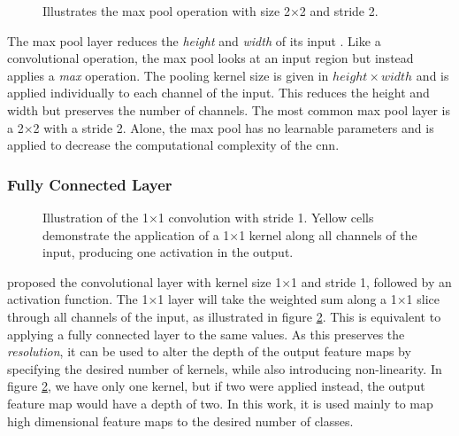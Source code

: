     \begin{figure}[H]
        \centering
                
        \caption[The max pool operation]{Illustrates the max pool operation with size 2×2 and stride 2.}
      	\medskip 
        \label{maxpool_fig}
    \end{figure}
    The max pool layer reduces the \textit{height} and \textit{width} of its input \cite{o2015introduction_convolutions}. Like a convolutional operation, the max pool looks at an input region but instead applies a \textit{max} operation. The pooling kernel size is given in $height \times width$ and is applied individually to each channel of the input. This reduces the height and width but preserves the number of channels. The most common max pool layer is a 2×2 with a stride 2. Alone, the max pool has no learnable parameters and is applied to decrease the computational complexity of the \gls{cnn}.


\subsubsection{Fully Connected Layer}
    \begin{figure}[H]
        \centering
        
        \caption[1×1 convolution]{Illustration of the 1×1 convolution with stride 1. Yellow cells demonstrate the application of a 1×1 kernel along all channels of the input, producing one activation in the output. }
      	\medskip 
        \label{1x1_fig}
    \end{figure}
    \citeauthor{lin2013network_in_network_1x1} \cite{lin2013network_in_network_1x1} proposed the convolutional layer with kernel size 1×1 and stride 1, followed by an activation function. The 1×1 layer will take the weighted sum along a 1×1 slice through all channels of the input, as illustrated in figure \ref{1x1_fig}. This is equivalent to applying a fully connected layer to the same values. As this preserves the \textit{resolution}, it can be used to alter the depth of the output feature maps by specifying the desired number of kernels, while also introducing non-linearity. In figure \ref{1x1_fig}, we have only one kernel, but if two were applied instead, the output feature map would have a depth of two. In this work, it is used mainly to map high dimensional feature maps to the desired number of classes.
    
